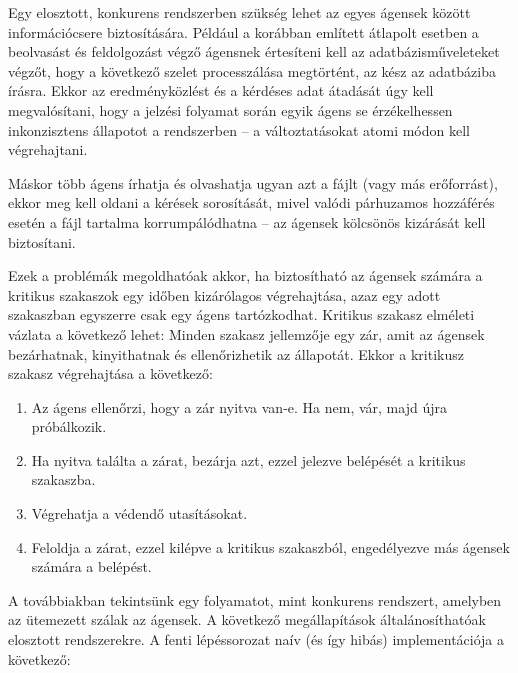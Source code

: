     Egy elosztott, konkurens rendszerben szükség lehet az egyes ágensek között információcsere biztosítására. Például a korábban említett átlapolt esetben a beolvasást és feldolgozást végző ágensnek értesíteni kell az adatbázisműveleteket végzőt, hogy a következő szelet processzálása megtörtént, az kész az adatbáziba írásra. Ekkor az eredményközlést és a kérdéses adat átadását úgy kell megvalósítani, hogy a jelzési folyamat során egyik ágens se érzékelhessen inkonzisztens állapotot a rendszerben -- a változtatásokat atomi módon kell végrehajtani.
        
    Máskor több ágens írhatja és olvashatja ugyan azt a fájlt (vagy más erőforrást), ekkor meg kell oldani a kérések sorosítását, mivel valódi párhuzamos hozzáférés esetén a fájl tartalma korrumpálódhatna -- az ágensek kölcsönös kizárását kell biztosítani.
        
    Ezek a problémák megoldhatóak akkor, ha biztosítható az ágensek számára a kritikus szakaszok egy időben kizárólagos végrehajtása, azaz egy adott szakaszban egyszerre csak egy ágens tartózkodhat. Kritikus szakasz elméleti vázlata a következő lehet: Minden szakasz jellemzője egy zár, amit az ágensek bezárhatnak, kinyithatnak és ellenőrizhetik az állapotát. Ekkor a kritikusz szakasz végrehajtása a következő:
        
    \begin{enumerate}
        \item Az ágens ellenőrzi, hogy a zár nyitva van-e. Ha nem, vár, majd újra próbálkozik.
        \item Ha nyitva találta a zárat, bezárja azt, ezzel jelezve belépését a kritikus szakaszba.
        \item Végrehatja a védendő utasításokat.
        \item Feloldja a zárat, ezzel kilépve a kritikus szakaszból, engedélyezve más ágensek számára a belépést.
    \end{enumerate}
%
    A továbbiakban tekintsünk egy folyamatot, mint konkurens rendszert, amelyben az ütemezett szálak az ágensek. A következő megállapítások általánosíthatóak elosztott rendszerekre. A fenti lépéssorozat naív (és így hibás) implementációja a következő:
    
        
